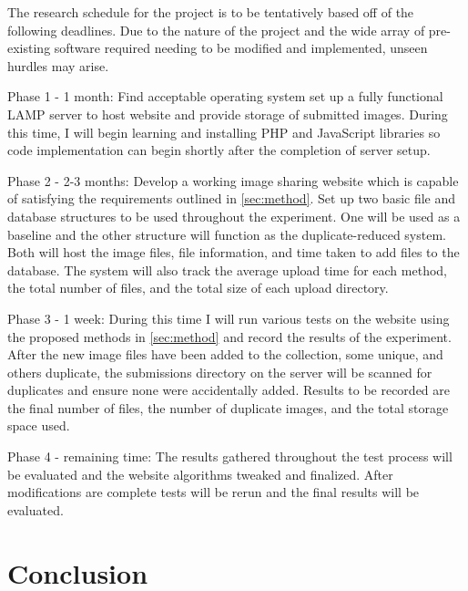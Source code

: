 \documentclass[11pt]{article}
\begin{document}
The research schedule for the project is to be tentatively based off of the following deadlines.
Due to the nature of the project and the wide array of pre-existing software required needing to
be modified and implemented, unseen hurdles may arise.

Phase 1 - 1 month: Find acceptable operating system set up a fully functional LAMP server to host website and provide storage of submitted images. During this time, I will begin learning and installing PHP and JavaScript libraries so code implementation can begin shortly after the completion of server setup.

Phase 2 - 2-3 months: Develop a working image sharing website which is capable of satisfying the requirements
outlined in \ref{sec:method}. Set up two basic file and database structures to be used throughout the experiment. One will be used as a baseline and the other structure will function as the duplicate-reduced system. Both will host the image files, file information, and time taken to add files to the database. The system will also track the average upload time for each method, the total number of files, and the total size of each upload directory.

Phase 3 - 1 week: During this time I will run various tests on the website using the proposed
methods in \ref{sec:method} and record the results of the experiment. After the new image files have been added to the collection, some unique, and others duplicate, the submissions directory on the server will be scanned for  duplicates and ensure none were accidentally added. Results to be recorded are the final number of files, the number of duplicate images, and the total storage space used.

Phase 4 - remaining time: The results gathered throughout the test process will be evaluated and
the website algorithms tweaked and finalized. After modifications are complete tests will be rerun and the
final results will be evaluated.
\vspace*{-.1in}
\section{Conclusion}
\label{sec:conclusion}
\vspace*{-.1in}

\end{document}
